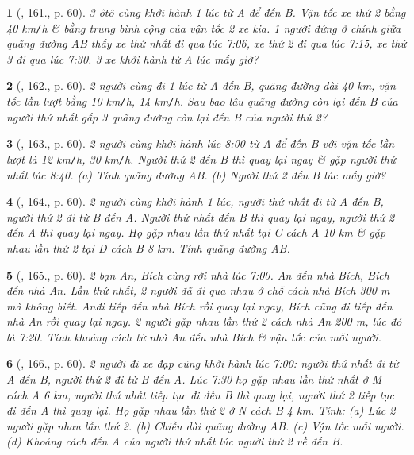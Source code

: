 \documentclass{article}
\newtheorem{baitoan}{}
\begin{document}
\begin{baitoan}[\cite{Binh_Toan_6_tap_2}, 161., p. 60]
	3 ôtô cùng khởi hành 1 lúc từ A để đến B. Vận tốc xe thứ 2 bằng {\rm40 km{\tt/}h} \& bằng trung bình cộng của vận tốc 2 xe kia. 1 người đứng ở chính giữa quãng đường AB thấy xe thứ nhất đi qua lúc {\rm7:06}, xe thứ 2 đi qua lúc {\rm7:15}, xe thứ 3 đi qua lúc {\rm7:30}. 3 xe khởi hành từ A lúc mấy giờ?
\end{baitoan}

\begin{baitoan}[\cite{Binh_Toan_6_tap_2}, 162., p. 60]
	2 người cùng đi 1 lúc từ A đến B, quãng đường dài {\rm40 km}, vận tốc lần lượt bằng {\rm10 km{\tt/}h, 14 km{\tt/}h}. Sau bao lâu quãng đường còn lại đến B của người thứ nhất gấp 3 quãng đường còn lại đến B của người thứ 2?
\end{baitoan}

\begin{baitoan}[\cite{Binh_Toan_6_tap_2}, 163., p. 60]
	2 người cùng khởi hành lúc {\rm8:00} từ A để đến B với vận tốc lần lượt là {\rm12 km{\tt/}h, 30 km{\tt/}h}. Người thứ 2 đến B thì quay lại ngay \& gặp người thứ nhất lúc {\rm8:40}. (a) Tính quãng đường AB. (b) Người thứ 2 đến B lúc mấy giờ?
\end{baitoan}

\begin{baitoan}[\cite{Binh_Toan_6_tap_2}, 164., p. 60]
	2 người cùng khởi hành 1 lúc, người thứ nhất đi từ A đến B, người thứ 2 đi từ B đến A. Người thứ nhất đến B thì quay lại ngay, người thứ 2 đến A thì quay lại ngay. Họ gặp nhau lần thứ nhất tại C cách A {\rm10 km} \& gặp nhau lần thứ 2 tại D cách B {\rm8 km}. Tính quãng đường AB.
\end{baitoan}

\begin{baitoan}[\cite{Binh_Toan_6_tap_2}, 165., p. 60]
	2 bạn An, Bích cùng rời nhà lúc {\rm7:00}. An đến nhà Bích, Bích đến nhà An. Lần thứ nhất, 2 người đã đi qua nhau ở chỗ cách nhà Bích {\rm300 m} mà không biết. Anđi tiếp đến nhà Bích rồi quay lại ngay, Bích cũng đi tiếp đến nhà An rồi quay lại ngay. 2 người gặp nhau lần thứ 2 cách nhà An {\rm200 m}, lúc đó là {\rm7:20}. Tính khoảng cách từ nhà An đến nhà Bích \& vận tốc của mỗi người.
\end{baitoan}

\begin{baitoan}[\cite{Binh_Toan_6_tap_2}, 166., p. 60]
	2 người đi xe đạp cũng khởi hành lúc {\rm7:00}: người thứ nhất đi từ A đến B, người thứ 2 đi từ B đến A. Lúc {\rm7:30} họ gặp nhau lần thứ nhất ở M cách A {\rm6 km}, người thứ nhất tiếp tục đi đến B thì quay lại, người thứ 2 tiếp tục đi đến A thì quay lại. Họ gặp nhau lần thứ 2 ở N cách B {\rm4 km}. Tính: (a) Lúc 2 người gặp nhau lần thứ 2. (b) Chiều dài quãng đường AB. (c) Vận tốc mỗi người. (d) Khoảng cách đến A của người thứ nhất lúc người thứ 2 về đến B.
\end{baitoan}
\end{document}
